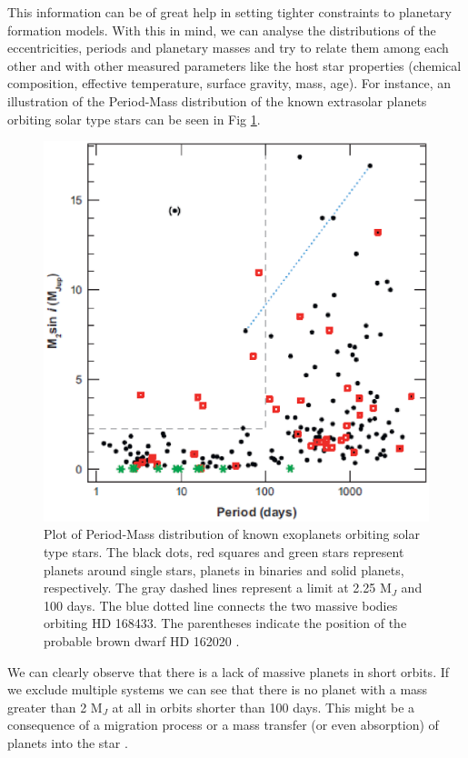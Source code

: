 \documentclass[dvips,12pt,a4paper]{report}
\begin{document}
This information can be of great help in setting tighter constraints to planetary formation models. With this in mind, we can analyse the distributions of the eccentricities, periods and planetary masses and try to relate them among each other and with other measured parameters like the host star properties (chemical composition, effective temperature, surface gravity, mass, age). For instance, an illustration of the Period-Mass distribution of the known extrasolar planets orbiting solar type stars can be seen in Fig \ref{planetmass}.

\begin{figure}[h]
\centering
\includegraphics[height=10 cm]{pics/massplanet2}
\caption[Period Mass distributions of known extrasolar planets ]{Plot of Period-Mass distribution of known exoplanets orbiting solar type stars. The black dots, red squares and green stars represent planets around single stars, planets in binaries and solid planets, respectively. The gray dashed lines represent a limit at 2.25 M$_{J}$ and 100 days. The blue dotted line connects the two massive bodies orbiting HD 168433. The parentheses indicate the position of the probable brown dwarf HD 162020 \citep{Udry-2007}. }
\label{planetmass}
\end{figure}

We can clearly observe that there is a lack of massive planets in short orbits. If we exclude multiple systems we can see that there is no planet with a mass greater than 2 M$_{J}$ at all in orbits shorter than 100 days. This might be a consequence of a migration process or a mass transfer (or even absorption) of planets into the star \citep[e.g.][]{Trilling-1998}. %
 
\end{document}
